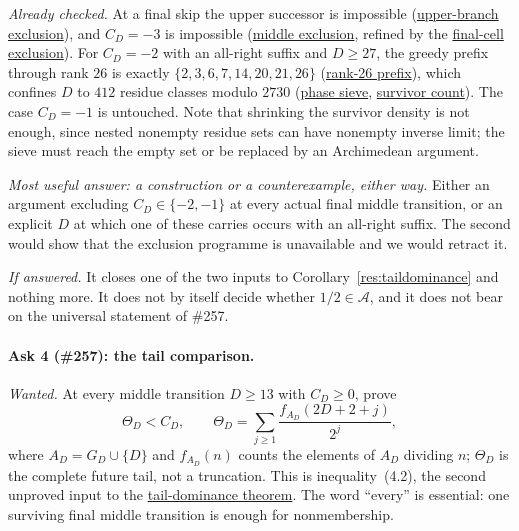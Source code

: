 \documentclass[11pt]{article}
\newcommand{\commit}{bb4e24651b37cd096d3749ef299c3317930b3a3b}
\newcommand{\repobase}{https://github.com/wcook04/plectis-lean-erdos249-257/blob/\commit}
\newcommand{\PK}{Erdos249257}
\newcommand{\lword}[4]{\href{\repobase/\PK/#1\#L#2}{#4}}
\theoremstyle{definition}
\theoremstyle{remark}
\begin{document}
\emph{Already checked.}  At a final skip the upper successor is impossible
(\lword{HalfCylinderLastProducerContradiction.lean}{299}{upperProducer_not_last}{upper-branch exclusion}),
and \(C_D=-3\) is impossible
(\lword{HalfCylinderLastProducerContradiction.lean}{364}{middleProducer_neg_three_not_last}{middle exclusion},
refined by the
\lword{HalfCylinderFinalMiddleCellEscape.lean}{587}{finalMiddleCell_neg_three_not_last}{final-cell exclusion}).
For \(C_D=-2\) with an all-right suffix and \(D\ge27\), the greedy prefix
through rank \(26\) is exactly \(\{2,3,6,7,14,20,21,26\}\)
(\lword{HalfFinalMiddlePhaseSieve.lean}{899}{seamGreedyBits_head2367_14_20_21_26}{rank-26 prefix}),
which confines \(D\) to \(412\) residue classes modulo \(2730\)
(\lword{HalfFinalMiddlePhaseSieve.lean}{1622}{finalMiddleCell_neg_two_forces_phase_refinement_through_twentySix}{phase sieve},
\lword{HalfFinalMiddlePhaseSieve.lean}{1759}{finalMiddleTwentySixPhaseSurvivors_card}{survivor count}).
The case \(C_D=-1\) is untouched.  Note that shrinking the survivor density
is not enough, since nested nonempty residue sets can have nonempty inverse
limit; the sieve must reach the empty set or be replaced by an Archimedean
argument.

\emph{Most useful answer: a construction or a counterexample, either way.}
Either an argument excluding \(C_D\in\{-2,-1\}\) at every actual final middle
transition, or an explicit \(D\) at which one of these carries occurs with an
all-right suffix.  The second would show that the exclusion programme is
unavailable and we would retract it.

\emph{If answered.}  It closes one of the two inputs to
Corollary~\ref{res:taildominance} and nothing more.  It does not by itself
decide whether \(1/2\in\mathcal A\), and it does not bear on the universal
statement of \#257.

\paragraph{Ask 4 (\#257): the tail comparison.}
\emph{Wanted.}  At every middle transition \(D\ge13\) with \(C_D\ge0\), prove
\[
 \Theta_D<C_D,
 \qquad
 \Theta_D=\sum_{j\ge1}\frac{f_{A_D}(2D+2+j)}{2^{j}},
\]
where \(A_D=G_D\cup\{D\}\) and \(f_{A_D}(n)\) counts the elements of
\(A_D\) dividing \(n\); \(\Theta_D\) is the complete future tail, not a
truncation.  This is inequality~\textup{(4.2)}, the second unproved input to
the
\lword{HalfCylinderLastProducerContradiction.lean}{436}{half_mem_mersenneAchievementSet_of_middleProducerTailEscapeExceptNegThree}{tail-dominance theorem}.
The word ``every'' is essential: one surviving final middle transition is
enough for nonmembership.
\end{document}
